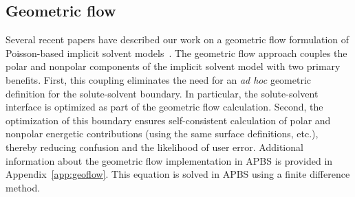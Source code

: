 \documentclass[12pt,titlepage]{article}
\begin{document}
\subsection{Geometric flow} \label{sec:geoflow}
Several recent papers have described our work on a geometric flow formulation of Poisson-based implicit solvent models~\cite{Chen2010, Chen2011, Chen2012, Daily2013, Thomas2013}.
The geometric flow approach couples the polar and nonpolar components of the implicit solvent model with two primary benefits.
First, this coupling eliminates the need for an \textit{ad hoc} geometric definition for the solute-solvent boundary.
In particular, the solute-solvent interface is optimized as part of the geometric flow calculation.
Second, the optimization of this boundary ensures self-consistent calculation of polar and nonpolar energetic contributions (using the same surface definitions, etc.), thereby reducing confusion and the likelihood of user error.
Additional information about the geometric flow implementation in APBS is provided in Appendix~\ref{app:geoflow}.
This equation is solved in APBS using a finite difference method.
\end{document}
